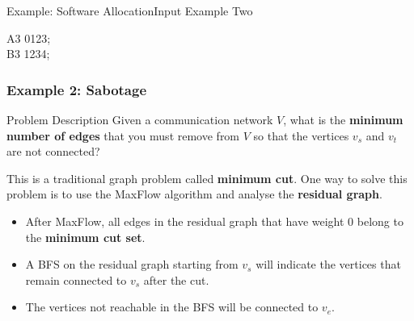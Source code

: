 \begin{frame}{Example: Software Allocation}{Input Example Two}

A3 0123;\\
B3 1234;\\
 \begin{center}
 \end{center}
\end{frame}

\begin{frame}
  \frametitle{Example 2: Sabotage}
  \begin{block}{Problem Description}
    Given a communication network $V$, what is the {\bf minimum number of edges} that you must remove from $V$ so that the vertices $v_s$ and $v_t$ are not connected?
  \end{block}\bigskip

  This is a traditional graph problem called {\bf minimum cut}. One way to solve this problem is to use the MaxFlow algorithm and analyse the {\bf residual graph}.\bigskip

  \begin{itemize}
    \item After MaxFlow, all edges in the residual graph that have weight $0$ belong to the {\bf minimum cut set}.
    \item A BFS on the residual graph starting from $v_s$ will indicate the vertices that remain connected to $v_s$ after the cut.
    \item The vertices not reachable in the BFS will be connected to $v_e$.
  \end{itemize}
\end{frame}


